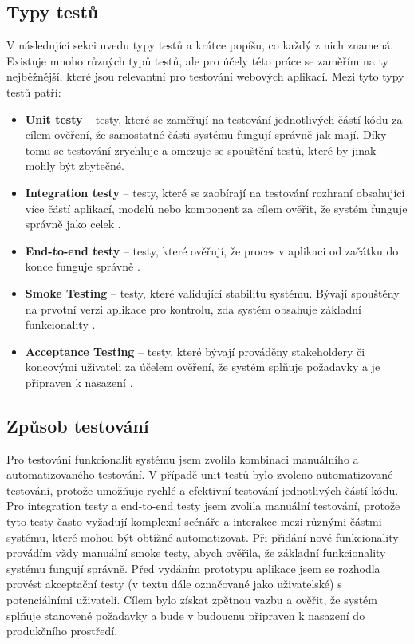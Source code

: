 \subsection{Typy testů}
V následující sekci uvedu typy testů a krátce popíšu, co každý z nich znamená. Existuje mnoho různých typů testů, ale pro účely této práce se zaměřím na ty nejběžnější, které jsou relevantní pro testování webových aplikací. 
Mezi tyto typy testů \cite{perfecto_types_of_testing} patří:
\begin{itemize}
    \item \textbf{Unit testy} – testy, které se zaměřují na testování jednotlivých částí kódu za cílem ověření, že samostatné části systému fungují správně jak mají. Díky tomu se testování zrychluje a omezuje se spouštění testů, které by jinak mohly být zbytečné.
    \item \textbf{Integration testy} – testy, které se zaobírají na testování rozhraní obsahující více částí aplikací, modelů nebo komponent za cílem ověřit, že systém funguje správně jako celek \cite{integration_testing_guide}.
    \item \textbf{End-to-end testy} – testy, které ověřují, že proces v aplikaci od začátku do konce funguje správně \cite{perfecto_types_of_testing}. 
    \item \textbf{Smoke Testing} – testy, které validující stabilitu systému. Bývají spouštěny na prvotní verzi aplikace pro kontrolu, zda systém obsahuje základní funkcionality \cite{perfecto_types_of_testing}. 
    \item \textbf{Acceptance Testing} – testy, které bývají prováděny stakeholdery či koncovými uživateli za účelem ověření, že systém splňuje požadavky a je připraven k nasazení \cite{perfecto_types_of_testing}. 
\end{itemize}

\subsection{Způsob testování}
Pro testování funkcionalit systému jsem zvolila kombinaci manuálního a automatizovaného testování. V případě unit testů bylo zvoleno automatizované testování, protože umožňuje rychlé a efektivní testování jednotlivých částí kódu. Pro integration testy a end-to-end testy jsem zvolila manuální testování, protože tyto testy často vyžadují komplexní scénáře a interakce mezi různými částmi systému, které mohou být obtížné automatizovat. Při přidání nové funkcionality provádím vždy manuální smoke testy, abych ověřila, že základní funkcionality systému fungují správně. Před vydáním prototypu aplikace jsem se rozhodla provést akceptační testy (v textu dále označované jako uživatelské) s potenciálními uživateli. Cílem bylo získat zpětnou vazbu a ověřit, že systém splňuje stanovené požadavky a bude v budoucnu připraven k nasazení do produkčního prostředí.

